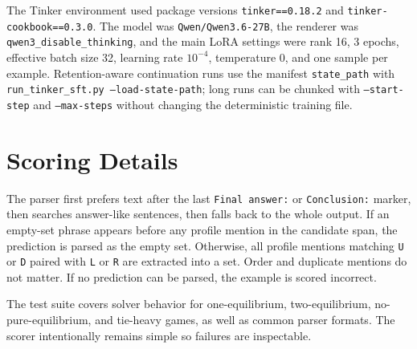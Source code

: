 \documentclass[11pt]{article}
\newcommand{\modelname}{\texttt{Qwen/\allowbreak Qwen3.6-27B}}
\begin{document}
The Tinker environment used package versions \texttt{tinker==0.18.2} and \texttt{tinker-cookbook==0.3.0}. The model was \modelname{}, the renderer was \texttt{qwen3\_disable\_thinking}, and the main LoRA settings were rank 16, 3 epochs, effective batch size 32, learning rate $10^{-4}$, temperature 0, and one sample per example. Retention-aware continuation runs use the manifest \texttt{state\_path} with \texttt{run\_tinker\_sft.py --load-state-path}; long runs can be chunked with \texttt{--start-step} and \texttt{--max-steps} without changing the deterministic training file.

\section{Scoring Details}

The parser first prefers text after the last \texttt{Final answer:} or \texttt{Conclusion:} marker, then searches answer-like sentences, then falls back to the whole output. If an empty-set phrase appears before any profile mention in the candidate span, the prediction is parsed as the empty set. Otherwise, all profile mentions matching \texttt{U} or \texttt{D} paired with \texttt{L} or \texttt{R} are extracted into a set. Order and duplicate mentions do not matter. If no prediction can be parsed, the example is scored incorrect.

The test suite covers solver behavior for one-equilibrium, two-equilibrium, no-pure-equilibrium, and tie-heavy games, as well as common parser formats. The scorer intentionally remains simple so failures are inspectable.
\end{document}
